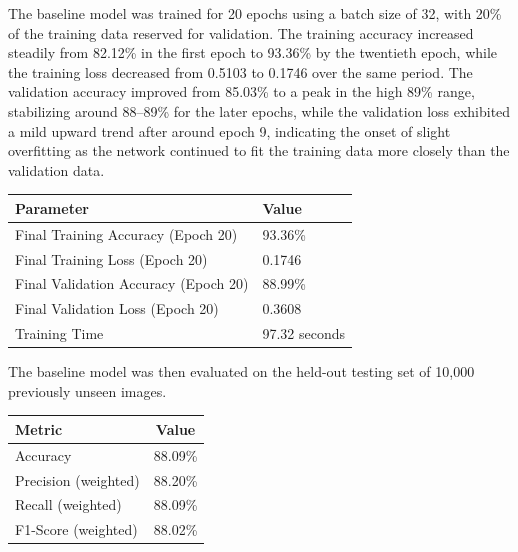 \documentclass[11pt,a4paper]{article}
\begin{document}
\vspace{0.15cm}

The baseline model was trained for 20 epochs using a batch size of 32, with 20\% of the training data reserved for validation. The training accuracy increased steadily from 82.12\% in the first epoch to 93.36\% by the twentieth epoch, while the training loss decreased from 0.5103 to 0.1746 over the same period. The validation accuracy improved from 85.03\% to a peak in the high 89\% range, stabilizing around 88--89\% for the later epochs, while the validation loss exhibited a mild upward trend after around epoch 9, indicating the onset of slight overfitting as the network continued to fit the training data more closely than the validation data.

\begin{center}
\begin{tabular}{|p{6cm}|p{6cm}|}
\hline
\textbf{Parameter} & \textbf{Value}\\
\hline
Final Training Accuracy (Epoch 20) & 93.36\%\\
\hline
Final Training Loss (Epoch 20) & 0.1746\\
\hline
Final Validation Accuracy (Epoch 20) & 88.99\%\\
\hline
Final Validation Loss (Epoch 20) & 0.3608\\
\hline
Training Time & 97.32 seconds\\
\hline
\end{tabular}
\end{center}

\vspace{0.15cm}

The baseline model was then evaluated on the held-out testing set of 10{,}000 previously unseen images.

\begin{center}
\begin{tabular}{|p{6cm}|c|}
\hline
\textbf{Metric} & \textbf{Value}\\
\hline
Accuracy & 88.09\%\\
\hline
Precision (weighted) & 88.20\%\\
\hline
Recall (weighted) & 88.09\%\\
\hline
F1-Score (weighted) & 88.02\%\\
\hline
\end{tabular}
\end{center}

\vspace{0.15cm}
\end{document}
